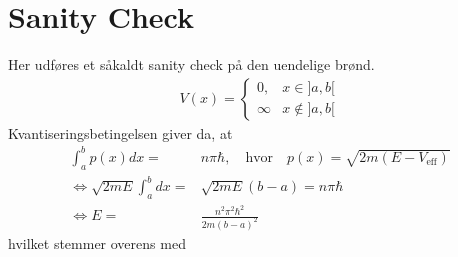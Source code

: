 \section{Sanity Check}
Her udføres et såkaldt sanity check på den uendelige brønd.
\begin{align}
    V(x) =
    \begin{cases}
    0, & x\in]a, b[ \\
    \infty & x\notin]a, b[
    \end{cases}
\end{align}
Kvantiseringsbetingelsen giver da, at
\begin{align}
    \int_{a}^{b} p(x) dx = & n\pi \hbar, \quad \text{hvor} \quad p(x) = \sqrt{2m(E-V_{\text{eff}})}\\
    \Leftrightarrow \sqrt{2mE}\int_{a}^{b} dx = & \sqrt{2mE}(b-a) = n\pi \hbar\\
    \Leftrightarrow E = & \frac{n^{2}\pi^{2}\hbar^{2}}{2m(b-a)^{2}}
\end{align}
hvilket stemmer overens med \cite[s. 30]{griffiths}

